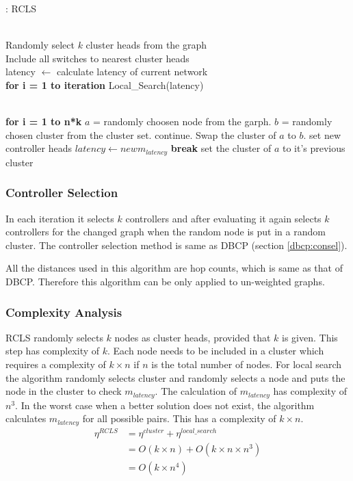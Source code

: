 \documentclass[a4paper,twocolumn,preprint]{elsarticle}
\begin{document}
\begin{algorithm}
	\caption{: RCLS}\label{rcls}
	\begin{algorithmic}[1]
		 \\
		Randomly select $k$ cluster heads from the graph \\
		Include all switches to nearest cluster heads \\
		latency $\gets$ calculate latency of current network \\
		\textbf{for i = 1 to iteration}
		\State Local\_Search(latency) \\
		\EndProcedure
		
		 \\
		\textbf{for i = 1 to n*k}
		\State $a$ = randomly choosen node from the garph.
		\State $b$ = randomly chosen cluster from the cluster set.
		\State continue.
		\EndIf
		\State Swap the cluster of $a$ to $b$.
		\State set new controller heads
		\State $latency \gets new m_{latency}$
		\State \textbf{break}
		\Else 
		\State set the cluster of $a$ to it's previous cluster
		\EndIf
		\EndProcedure
	\end{algorithmic}
\end{algorithm}

\subsubsection{Controller Selection}
In each iteration it selects $k$ controllers and after evaluating it again selects $k$ controllers for the changed graph when the random node is put in a random cluster. The controller selection method is same as DBCP (section \ref{dbcp:consel}).

All the distances used in this algorithm are hop counts, which is same as that of DBCP.
Therefore this algorithm can be only applied to un-weighted graphs.

\subsubsection{Complexity Analysis}
RCLS randomly selects $k$ nodes as cluster heads, provided that $k$ is given. This step has complexity of $k$. Each node needs to be included in a cluster which requires a complexity of $k\times n$ if $n$ is the total number of nodes. For local search the algorithm randomly selects cluster and randomly selects a node and puts the node in the cluster to check $m_{latency}$. The calculation of $m_{latency}$ has complexity of $n^3$. In the worst case when a better solution does not exist, the algorithm calculates $m_{latency}$ for all possible pairs. This has a complexity of $k\times n$.
\begin{equation}
\begin{split}
\eta^{RCLS} &= \eta^{cluster} + \eta^{local\_search} \\
&= O(k\times n) + O(k\times n \times n^3) \\
&= O(k\times n^4) \\
\end{split}
\end{equation}
\end{document}
